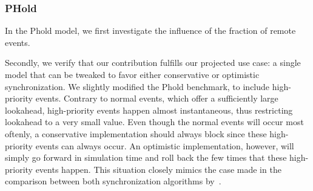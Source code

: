 \subsubsection{PHold}
In the Phold model, we first investigate the influence of the fraction of remote events.

Secondly, we verify that our contribution fulfills our projected use case: a single model that can be tweaked to favor either conservative or optimistic synchronization.
We slightly modified the Phold benchmark, to include high-priority events.
Contrary to normal events, which offer a sufficiently large lookahead, high-priority events happen almost instantaneous, thus restricting lookahead to a very small value.
Even though the normal events will occur most oftenly, a conservative implementation should always block since these high-priority events can always occur.
An optimistic implementation, however, will simply go forward in simulation time and roll back the few times that these high-priority events happen.
This situation closely mimics the case made in the comparison between both synchronization algorithms by~\cite{FujimotoBook}.


